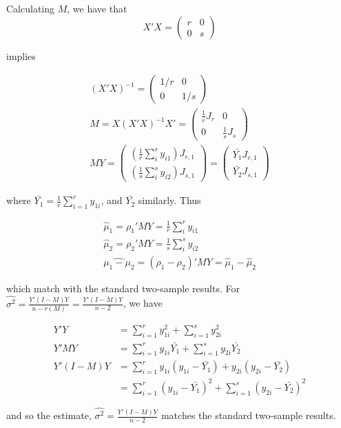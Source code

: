 \documentclass{article}
\begin{document}
Calculating $M$, we have that
\[
X'X = \begin{pmatrix}
r & 0 \\
0 & s \end{pmatrix}
\]

implies

\begin{gather*}
(X'X)^{-1} = \begin{pmatrix}
1/r & 0 \\
0 & 1/s \end{pmatrix} \\
M = X(X'X)^{-1}X' = \begin{pmatrix}
\frac{1}{r} J_{r} & 0 \\
0 & \frac{1}{s} J_{s}
\end{pmatrix} \\
MY = \begin{pmatrix}
\left(\frac{1}{r}\sum_i^r y_{i1}\right)J_{r,1} \\
\left(\frac{1}{s}\sum_i^s y_{i2}\right)J_{s,1}
\end{pmatrix} = 
\begin{pmatrix}
\bar{Y_1}J_{r,1} \\
\bar{Y_2}J_{s,1}
\end{pmatrix}
\end{gather*}

where $\bar{Y_1} = \frac{1}{r}\sum_{i=1}^r y_{1i}$, and $\bar{Y_2}$ similarly. Thus

\begin{gather}
\hat{\mu}_1 = \rho_1'MY = \frac{1}{r}\sum_i^r y_{i1} \\
\hat{\mu}_2 = \rho_2'MY = \frac{1}{s}\sum_i^s y_{i2} \\
\widehat{\mu_1-\mu_2} = (\rho_1-\rho_2)'MY = \hat{\mu}_1 - \hat{\mu}_2
\end{gather}

which match with the standard two-sample results. For $\hat{\sigma^2} = \frac{Y'(I-M)Y}{n-r(M)} = \frac{Y'(I-M)Y}{n-2}$, we have

\begin{align*}
Y'Y &= \sum_{i=1}^r y_{1i}^2 + \sum_{i=1}^s y_{2i}^2 \\
Y'MY &= \sum_{i=1}^r y_{1i}\bar{Y_1} + \sum_{i=1}^s y_{2i}\bar{Y_2} \\
Y'(I-M)Y &= \sum_{i=1}^r y_{1i}(y_{1i}-\bar{Y_1}) + y_{2i}(y_{2i}-\bar{Y_2})  \\
&= \sum_{i=1}^r (y_{1i}-\bar{Y_1})^2 + \sum_{i=1}^s (y_{2i}-\bar{Y_2})^2
\end{align*}

and so the estimate, $\hat{\sigma^2} = \frac{Y'(I-M)Y}{n-2}$ matches the standard two-sample results. 
\end{document}
